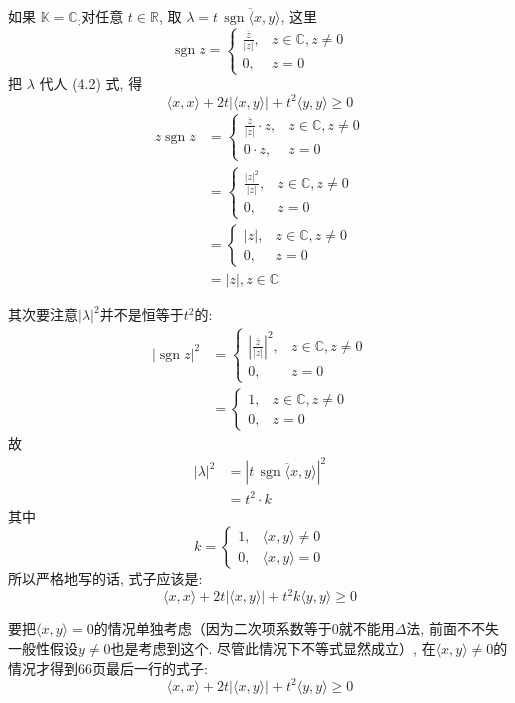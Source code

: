 \begin{detail}{66}{如果 $\mathbb{K}=\mathbb{C}_{;}$对任意 $t \in \mathbb{R}$, 取 $\lambda=t\,\overline{\operatorname{sgn}\langle x, y\rangle}$, 这里
    \[
    \operatorname{sgn} z= \begin{cases}\frac{\overline{z}}{|z|}, & z \in \mathbb{C}, z \neq 0 \\ 0, & z=0\end{cases}
    \]
    把 $\lambda$ 代人 (4.2) 式, 得
    \[
    \langle x, x\rangle+2 t|\langle x, y\rangle|+t^{2}\langle y, y\rangle \geqslant 0
    \]}
    \begin{align*}
        z \operatorname{sgn}z &= \begin{cases}\frac{\overline{z}}{|z|}\cdot z, & z \in \mathbb{C}, z \neq 0 \\ 0\cdot z, & z=0\end{cases}\\
        &= \begin{cases}\frac{|z|^2}{|z|}, & z \in \mathbb{C}, z \neq 0 \\ 0, & z=0\end{cases}\\
        &= \begin{cases}|z|, & z \in \mathbb{C}, z \neq 0 \\ 0, & z=0\end{cases}\\
        &=|z|, z \in \mathbb{C}
    \end{align*}

    其次要注意$|\lambda|^2$并不是恒等于$t^2$的:
    \begin{align*}
        |\operatorname{sgn}z|^2 &=\begin{cases}\left|\frac{\overline{z}}{|z|}\right|^2, & z \in \mathbb{C}, z \neq 0 \\ 0, & z=0\end{cases}\\
        &=\begin{cases}1, & z \in \mathbb{C}, z \neq 0 \\ 0, & z=0\end{cases}
    \end{align*}故
    \begin{align*}
        | \lambda|^2&=\left|t\,\overline{\operatorname{sgn}\langle x, y\rangle}\right|^2\\
        &=t^2 \cdot k
    \end{align*}其中\[
        k=\begin{cases}
            1, &\langle x,y \rangle \neq 0\\
            0, &\langle x,y \rangle =0
        \end{cases}\]
    所以严格地写的话, 式子应该是: \[
        \langle x, x\rangle+2 t|\langle x, y\rangle|+t^{2}k\langle y, y\rangle \geqslant 0
        \]
    
        要把$\langle x,y \rangle =0$的情况单独考虑（因为二次项系数等于0就不能用$\Delta$法, 前面不不失一般性假设$y\neq 0$也是考虑到这个. 尽管此情况下不等式显然成立）, 在$\langle x,y \rangle \neq 0$的情况才得到66页最后一行的式子: \[
        \langle x, x\rangle+2 t|\langle x, y\rangle|+t^{2}\langle y, y\rangle \geqslant 0
        \]
\end{detail}
